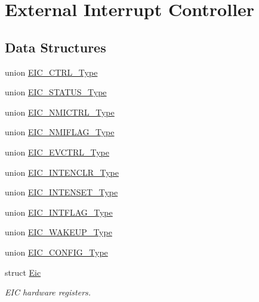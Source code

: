 \hypertarget{group___s_a_m_d21___e_i_c}{}\section{External Interrupt Controller}
\label{group___s_a_m_d21___e_i_c}
\subsection*{Data Structures}
\begin{DoxyCompactItemize}
\item 
union \mbox{\hyperlink{union_e_i_c___c_t_r_l___type}{E\+I\+C\+\_\+\+C\+T\+R\+L\+\_\+\+Type}}
\item 
union \mbox{\hyperlink{union_e_i_c___s_t_a_t_u_s___type}{E\+I\+C\+\_\+\+S\+T\+A\+T\+U\+S\+\_\+\+Type}}
\item 
union \mbox{\hyperlink{union_e_i_c___n_m_i_c_t_r_l___type}{E\+I\+C\+\_\+\+N\+M\+I\+C\+T\+R\+L\+\_\+\+Type}}
\item 
union \mbox{\hyperlink{union_e_i_c___n_m_i_f_l_a_g___type}{E\+I\+C\+\_\+\+N\+M\+I\+F\+L\+A\+G\+\_\+\+Type}}
\item 
union \mbox{\hyperlink{union_e_i_c___e_v_c_t_r_l___type}{E\+I\+C\+\_\+\+E\+V\+C\+T\+R\+L\+\_\+\+Type}}
\item 
union \mbox{\hyperlink{union_e_i_c___i_n_t_e_n_c_l_r___type}{E\+I\+C\+\_\+\+I\+N\+T\+E\+N\+C\+L\+R\+\_\+\+Type}}
\item 
union \mbox{\hyperlink{union_e_i_c___i_n_t_e_n_s_e_t___type}{E\+I\+C\+\_\+\+I\+N\+T\+E\+N\+S\+E\+T\+\_\+\+Type}}
\item 
union \mbox{\hyperlink{union_e_i_c___i_n_t_f_l_a_g___type}{E\+I\+C\+\_\+\+I\+N\+T\+F\+L\+A\+G\+\_\+\+Type}}
\item 
union \mbox{\hyperlink{union_e_i_c___w_a_k_e_u_p___type}{E\+I\+C\+\_\+\+W\+A\+K\+E\+U\+P\+\_\+\+Type}}
\item 
union \mbox{\hyperlink{union_e_i_c___c_o_n_f_i_g___type}{E\+I\+C\+\_\+\+C\+O\+N\+F\+I\+G\+\_\+\+Type}}
\item 
struct \mbox{\hyperlink{struct_eic}{Eic}}
\begin{DoxyCompactList}\small\item\em E\+IC hardware registers. \end{DoxyCompactList}\end{DoxyCompactItemize}
